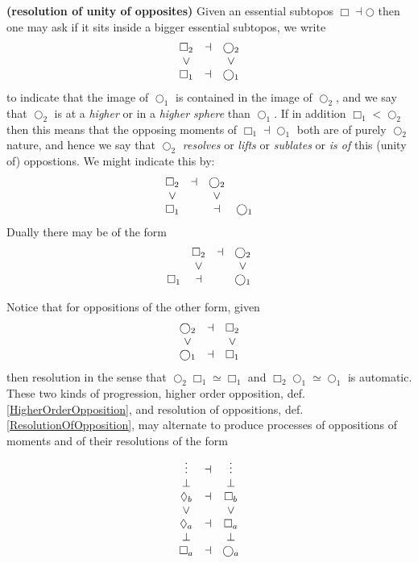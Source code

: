 \begin{defn}
\label{ResolutionOfOpposition}\hypertarget{ResolutionOfOpposition}{}
\textbf{(resolution of unity of opposites)}
Given an essential subtopos $\Box \dashv \bigcirc$ then one may ask if it sits inside a bigger essential subtopos, we write
\begin{displaymath}
\begin{matrix}
\Box_2 &\dashv& \bigcirc_2
\\
\vee && \vee
\\
\Box_1 &\dashv& \bigcirc_1
\end{matrix}
\end{displaymath}
to indicate that the image of $\bigcirc_1$ is contained in the image of $\bigcirc_2$, and we say that $\bigcirc_2$ is at a \emph{higher } or in a \emph{higher sphere} than $\bigcirc_1$.
If in addition $\Box_1 \lt \bigcirc_2$ then this means that the opposing moments of $\Box_1 \dashv \bigcirc_1$ both are of purely $\bigcirc_2$ nature, and hence we say that $\bigcirc_2$ \emph{resolves} or \emph{lifts} or \emph{sublates} or \emph{is  of} this (unity of) oppostions. We might indicate this by:
\begin{displaymath}
\begin{matrix}
\Box_2 &\dashv& \bigcirc_2
\\
\vee && \vee
\\
\Box_1 & &\dashv& \bigcirc_1
\end{matrix}
\end{displaymath}
Dually there may be  of the form
\begin{displaymath}
\begin{matrix}
& \Box_2 &\dashv& \bigcirc_2
\\
& \vee && \vee
\\
\Box_1 &\dashv& & \bigcirc_1
\end{matrix}
\end{displaymath}
\end{defn}
Notice that for oppositions of the other form, given
\begin{displaymath}
\begin{matrix}
\bigcirc_2 &\dashv& \Box_2
\\
\vee && \vee
\\
\bigcirc_1 &\dashv& \Box_1
\end{matrix}
\end{displaymath}
then resolution in the sense that $\bigcirc_2 \Box _1 \simeq \Box_1$ and $\Box_2 \bigcirc_1 \simeq \bigcirc_1$ is automatic.
These two kinds of progression, higher order opposition, def. \ref{HigherOrderOpposition}, and resolution of oppositions, def. \ref{ResolutionOfOpposition}, may alternate to produce processes of oppositions of moments and of their resolutions of the form
\begin{displaymath}
\begin{matrix}
\vdots  &\dashv& \vdots
\\
\bot && \bot
\\
\lozenge_b &\dashv& \Box_b
\\
\vee && \vee
\\
\lozenge_a &\dashv& \Box_a
\\
\bot && \bot
\\
\Box_a &\dashv& \bigcirc_a
\end{matrix}
\end{displaymath}

